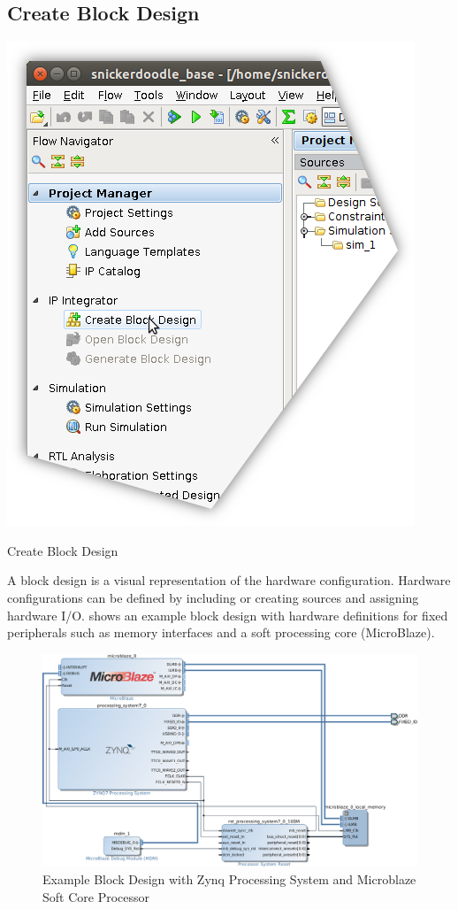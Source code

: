 \subsection{Create Block Design}

\begin{marginfigure}
	\centering
	\includegraphics{images/Create_Block_Design.png}
	\caption[Create Block Design]{Create Block Design}
	\label{fig:createblockdesign}
\end{marginfigure}

A block design is a visual representation of the hardware configuration. Hardware configurations can be defined by including or creating sources and assigning hardware I/O.  shows an example block design with hardware definitions for fixed peripherals such as memory interfaces and a soft processing core (MicroBlaze). \\

\begin{figure}
	\centering
	\includegraphics{images/Example_Block_Design.png}
	\caption{Example Block Design with Zynq Processing System and Microblaze Soft Core Processor}
	\label{fig:exampleblockdesign}
\end{figure}


